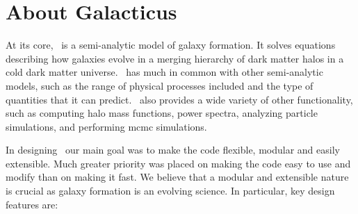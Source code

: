\chapter{About Galacticus}

At its core, \glc\ is a semi-analytic model of galaxy formation. It solves equations describing how galaxies evolve in a merging hierarchy of dark matter halos in a cold dark matter universe. \glc\ has much in common with other semi-analytic models, such as the range of physical processes included and the type of quantities that it can predict. \glc\ also provides a wide variety of other functionality, such as computing halo mass functions, power spectra, analyzing particle simulations, and performing \gls{mcmc} simulations.

In designing \glc\ our main goal was to make the code flexible, modular and easily extensible. Much greater priority was placed on making the code easy to use and modify than on making it fast. We believe that a modular and extensible nature is crucial as galaxy formation is an evolving science. In particular, key design features are:
